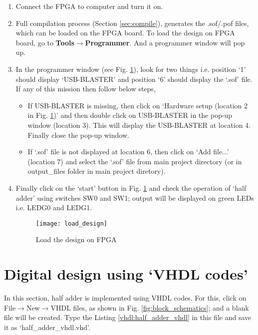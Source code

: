 \begin{enumerate}
	\item Connect the FPGA to computer and turn it on. 
	
	\item Full compilation process (Section \ref{sec:compile}), generates the .sof/.pof files, which can be loaded on the FPGA board. To load the design on FPGA board, go to \textbf{Tools$\rightarrow$Programmer}. And a programmer window will pop up. 
	
	\item In the programmer window (see Fig. \ref{fig:load_design}), look for two things i.e. position `1' should display `USB-BLASTER' and position `6' should display the `.sof' file. If any of this mission then follow below steps, 
	
	\begin{itemize}
		\item If USB-BLASTER is missing, then click on `Hardware setup (location 2 in Fig. \ref{fig:load_design})' and then double click on USB-BLASTER in the pop-up window (location 3). This will display the USB-BLASTER at location 4. Finally close the pop-up window. 
		
		\item If `.sof' file is not displayed at location 6, then click on `Add file...' (location 7) and select the `.sof' file from main project directory (or in output\_files folder in main project diretory).
	\end{itemize} 
	
	\item Finally click on the `start' button in Fig. \ref{fig:load_design} and check the operation of `half adder' using switches SW0 and SW1; output will be displayed on green LEDs i.e. LEDG0 and LEDG1. 
	
	\begin{figure}[!h]
		\centering
		\texttt{[image: load\_design]}
		\caption{Load the design on FPGA}
		\label{fig:load_design}
	\end{figure}
\end{enumerate}

\section{Digital design using `VHDL codes'} \label{sec:digital_des_with_vhdl}

In this section, half adder is implemented using VHDL codes. For this, click on File$\rightarrow$New$\rightarrow$VHDL files, as shown in Fig. \ref{fig:block_schematics}; and a blank file will be created. Type the Listing \ref{vhdl:half_adder_vhdl} in this file and save it as `half\_adder\_vhdl.vhd'. 

